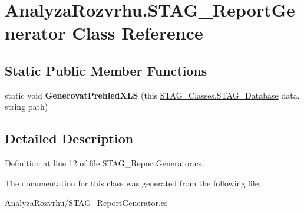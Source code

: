 \hypertarget{class_analyza_rozvrhu_1_1_s_t_a_g___report_generator}{}\section{Analyza\+Rozvrhu.\+S\+T\+A\+G\+\_\+\+Report\+Generator Class Reference}
\label{class_analyza_rozvrhu_1_1_s_t_a_g___report_generator}
\subsection*{Static Public Member Functions}
\begin{DoxyCompactItemize}
\item 
\mbox{\label{class_analyza_rozvrhu_1_1_s_t_a_g___report_generator_a0e99e1657fd1abc8f9195b0b4fa867ca}} 
static void {\bfseries Generovat\+Prehled\+X\+LS} (this \hyperlink{class_analyza_rozvrhu_1_1_s_t_a_g___classes_1_1_s_t_a_g___database}{S\+T\+A\+G\+\_\+\+Classes.\+S\+T\+A\+G\+\_\+\+Database} data, string path)
\end{DoxyCompactItemize}


\subsection{Detailed Description}


Definition at line 12 of file S\+T\+A\+G\+\_\+\+Report\+Generator.\+cs.



The documentation for this class was generated from the following file\+:\begin{DoxyCompactItemize}
\item 
Analyza\+Rozvrhu/S\+T\+A\+G\+\_\+\+Report\+Generator.\+cs\end{DoxyCompactItemize}
